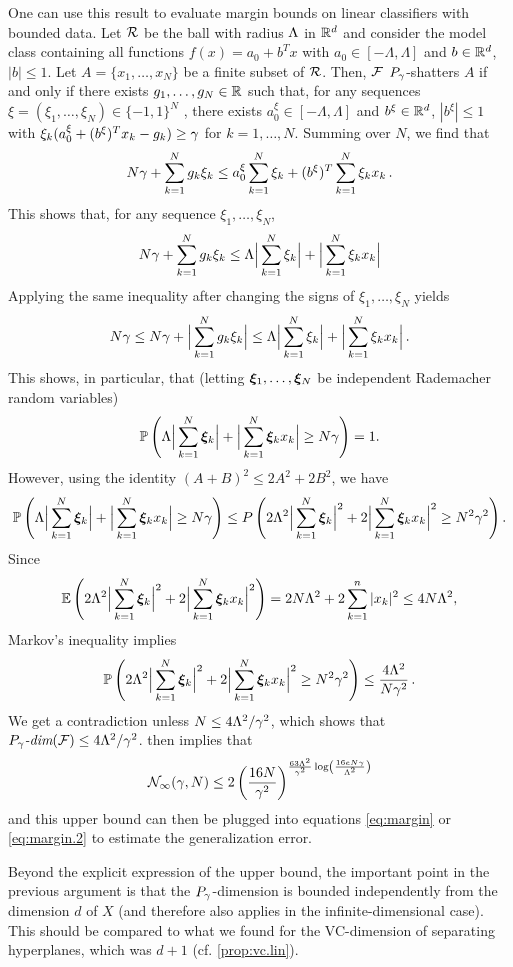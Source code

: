 One can use this result to evaluate margin bounds on linear classifiers with bounded data. Let $\CR$ be the ball with radius $\La$ in $\mR^d$ and consider the model class containing all functions $f(x) = a_0 + b^T x$ with $a_0\in [-\Lambda, \Lambda]$ and $b\in \mR^d$, $|b|\leq 1$. Let $A = \{x_1, \ldots, x_N\}$ be a finite subset of $\CR$. Then, $\CF$ $P_\ga$-shatters $A$ if and only if there exists $g_1, \ldots, g_N\in \mR$ such that, for any sequences $ \xi = (\xi_1, \ldots, \xi_N)\in \{-1,1\}^N$ , there exists $a^{\xi}_0\in [-\Lambda,\Lambda]$ and $b^{\xi}\in \mR^d$, $|b^\xi|\leq 1$ with
$\xi_k(a^{\xi}_0  + (b^\xi)^T x_k - g_k) \geq \ga$ for $k=1, \ldots, N$. Summing over $N$, we find that
\[
N\ga + \sum_{k=1}^N g_k\xi_k \leq a^{\xi}_0\sum_{k=1}^N\xi_k + (b^{\xi})^T \sum_{k=1}^N \xi_k x_k\,.
\]
This shows that, for any sequence $\xi_1, \ldots, \xi_N$, 
\[
N\ga + \sum_{k=1}^N g_k\xi_k \leq \La\Big|\sum_{k=1}^N\xi_k\Big| + \Big|\sum_{k=1}^N \xi_k x_k\Big|
\]
Applying the same inequality after changing the signs of $\xi_1, \ldots, \xi_N$ yields
\[
N\ga \leq N\ga + \Big|\sum_{k=1}^N g_k\xi_k\Big| \leq \La\Big|\sum_{k=1}^N\xi_k\Big| + \Big|\sum_{k=1}^N \xi_k x_k\Big|\,.
\]
This shows, in particular, that (letting $\bfxi_1, \ldots, \bfxi_N$ be independent Rademacher random variables)
\[
\myP\left(\La\Big|\sum_{k=1}^N\bfxi_k\Big| + \Big|\sum_{k=1}^N \bfxi_k x_k \Big| \geq N\ga\right) = 1.
\]
However, using the identity $(A+B)^2 \leq 2A^2 + 2 B^2$, we have 
\[
\myP\left(\La\Big|\sum_{k=1}^N\bfxi_k\Big| + \Big|\sum_{k=1}^N \bfxi_k x_k\Big| \geq N\ga\right) 
\leq P\left(2\La^2\Big|\sum_{k=1}^N\bfxi_k\Big|^2 + 2\Big|\sum_{k=1}^N \bfxi_k x_k\Big|^2 \geq N^2\ga^2\right).
\]
Since
\[
\myE\left(2\La^2\Big|\sum_{k=1}^N\bfxi_k\Big|^2 + 2\Big|\sum_{k=1}^N \bfxi_k x_k\Big|^2\right) = 2N\La^2 + 2\sum_{k=1}^n |x_k|^2 \leq 4N\La^2,
\]
Markov's inequality implies 
\[
\myP\left(2\La^2\Big|\sum_{k=1}^N\bfxi_k\Big|^2 + 2\Big|\sum_{k=1}^N \bfxi_k x_k\Big|^2 \geq N^2\ga^2\right)
\leq \frac{4\La^2}{N\ga^2}\,.
\]
We get a contradiction unless $N \leq 4\La^2/\ga^2$, which shows that
$\Pdim[\ga](\CF) \leq 4\La^2/\ga^2$.    then implies that 
\[
\CN_\infty(\ga, N) \leq 2 \left(\frac{16N}{\ga^2}\right)^{\frac{63\La^2}{\ga^2} \log\left(\frac{16eN\gamma}{\La^2}\right)}
\]
and this upper bound can then be plugged into equations \cref{eq:margin} or \cref{eq:margin.2}
to estimate the generalization error.

Beyond the explicit expression of the upper bound, the important point in the previous argument is that the $P_\ga$-dimension is bounded independently from the dimension $d$ of $X$ (and therefore also applies in the infinite-dimensional case). 
This should be compared to what we found for the VC-dimension of separating hyperplanes, which was $d+1$ (cf.  \cref{prop:vc.lin}).


